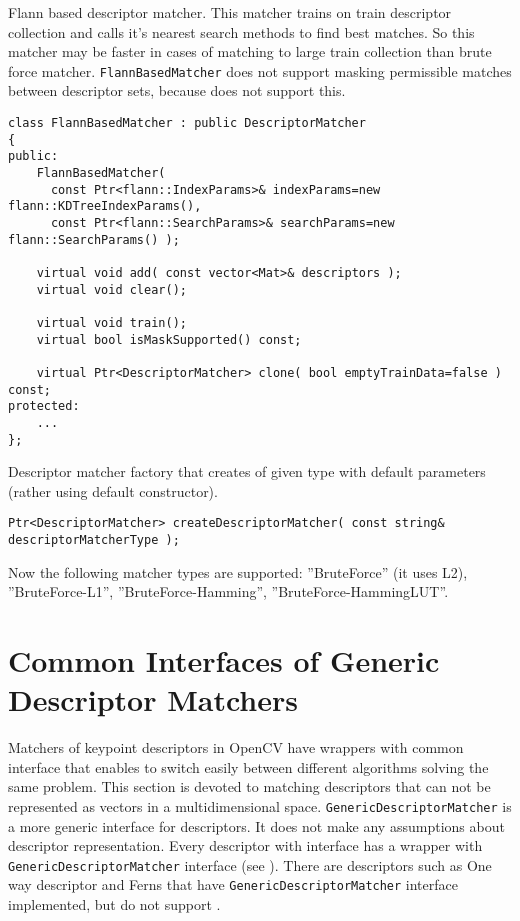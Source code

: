 Flann based descriptor matcher. This matcher trains  on 
train descriptor collection and calls it's nearest search methods to find best matches. 
So this matcher may be faster in cases of matching to large train collection than 
brute force matcher. \texttt{FlannBasedMatcher} does not support masking permissible 
matches between descriptor sets, because  does not 
support this.

\begin{lstlisting}
class FlannBasedMatcher : public DescriptorMatcher
{
public:
    FlannBasedMatcher( 
      const Ptr<flann::IndexParams>& indexParams=new flann::KDTreeIndexParams(),
      const Ptr<flann::SearchParams>& searchParams=new flann::SearchParams() );

    virtual void add( const vector<Mat>& descriptors );
    virtual void clear();

    virtual void train();
    virtual bool isMaskSupported() const;
    
    virtual Ptr<DescriptorMatcher> clone( bool emptyTrainData=false ) const;
protected:
    ...
};
\end{lstlisting}

Descriptor matcher factory that creates  of 
given type with default parameters (rather using default constructor).

\begin{lstlisting}
Ptr<DescriptorMatcher> createDescriptorMatcher( const string& descriptorMatcherType );
\end{lstlisting}

\begin{description}
\end{description}
Now the following matcher types are supported: ''BruteForce'' (it uses L2), ''BruteForce-L1'', 
''BruteForce-Hamming'', ''BruteForce-HammingLUT''.

\section{Common Interfaces of Generic Descriptor Matchers}
Matchers of keypoint descriptors in OpenCV have wrappers with common interface that enables to switch easily 
between different algorithms solving the same problem. This section is devoted to matching descriptors 
that can not be represented as vectors in a multidimensional space. \texttt{GenericDescriptorMatcher} 
is a more generic interface for descriptors. It does not make any assumptions about descriptor representation. 
Every descriptor with  interface has a wrapper with 
\texttt{GenericDescriptorMatcher} interface (see ). 
There are descriptors such as One way descriptor and Ferns that have \texttt{GenericDescriptorMatcher} 
interface implemented, but do not support .

